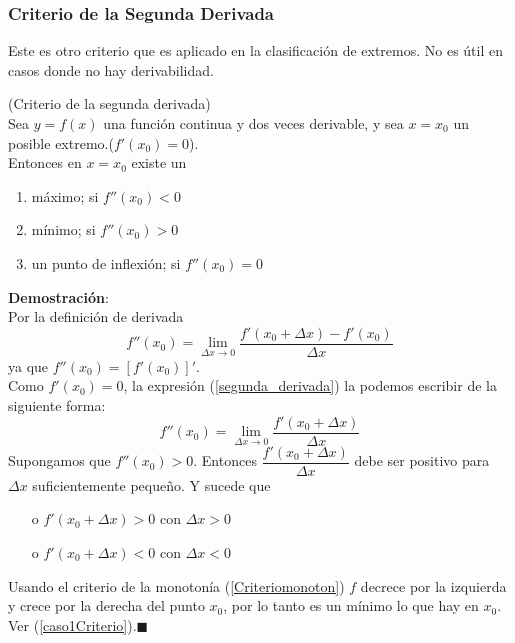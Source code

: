 \documentclass[10pt,twoside]{SelfArx} %
\begin{document}
    \subsubsection{Criterio de la Segunda Derivada}
    Este es otro criterio que es aplicado en la clasificación de extremos. No es útil en casos donde no hay derivabilidad.
    \begin{teorema}\label{Criterio_de_la_segunda_derivada}
    	(Criterio de la segunda derivada)\\
    	Sea $ y=f(x) $ una función continua y dos veces derivable, y sea $ x=x_{0} $ un posible extremo.($ f'(x_{0})=0$). \\
    	Entonces en $ x=x_{0} $ existe un
    	\begin{enumerate}
    		\item máximo; si $ f''(x_{0})<0 $
    		\item mínimo; si $ f''(x_{0})>0 $
    		\item un punto de inflexión; si $ f''(x_{0})=0 $
    	\end{enumerate}
    \end{teorema}
\textbf{Demostración}:\\
Por la definición de derivada 
\begin{equation}
f''(x_{0})=\lim\limits_{\Delta x\rightarrow0}\dfrac{f'(x_{0}+\Delta x)-f'(x_{0})}{\Delta x}\label{segunda_derivada}
\end{equation}
ya que $ f''(x_{0})= \left[f'(x_{0})\right ]' $.\\
Como $ f'(x_{0})=0 $, la expresión (\ref{segunda_derivada}) la podemos escribir de la siguiente forma:
\begin{equation}
f''(x_{0})=\lim\limits_{\Delta x\rightarrow0}\dfrac{f'(x_{0}+\Delta x)}{\Delta x}
\end{equation}
    Supongamos que $ f''(x_{0})>0 $. Entonces $ \dfrac{f'(x_{0}+\Delta x)}{\Delta x} $ debe ser positivo para $ \Delta x  $ suficientemente pequeño. Y sucede que 
    \begin{enumerate}
    	\item[o] $ f'(x_{0}+\Delta x)>0 $ con $ \Delta x>0 $
		\item[o] $ f'(x_{0}+\Delta x)<0 $ con $ \Delta x<0 $
    \end{enumerate}
    Usando el criterio de la monotonía (\ref{Criteriomonoton}) $ f $ decrece por la izquierda y crece por la derecha del punto $ x_{0} $, por lo tanto es un mínimo lo que hay en $ x_{0} $. Ver (\ref{caso1Criterio}).$ \blacksquare $\\
\end{document}

